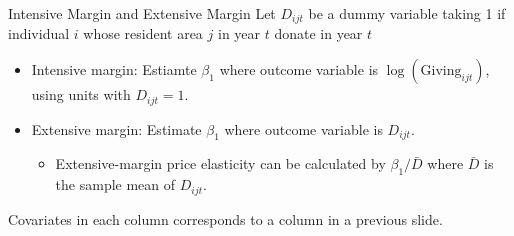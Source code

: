 \documentclass[
  ignorenonframetext,
]{beamer}
\providecommand{\tightlist}{%
  \setlength{\itemsep}{0pt}\setlength{\parskip}{0pt}}
\begin{document}
\begin{frame}{Intensive Margin and Extensive Margin}
\protect\hypertarget{intensive-margin-and-extensive-margin}{}
Let \(D_{ijt}\) be a dummy variable taking 1 if individual \(i\) whose
resident area \(j\) in year \(t\) donate in year \(t\)

\begin{itemize}
\tightlist
\item
  Intensive margin: Estiamte \(\beta_1\) where outcome variable is
  \(\log(\text{Giving}_{ijt})\), using units with \(D_{ijt} = 1\).
\item
  Extensive margin: Estimate \(\beta_1\) where outcome variable is
  \(D_{ijt}\).

  \begin{itemize}
  \tightlist
  \item
    Extensive-margin price elasticity can be calculated by
    \(\beta_1/\bar{D}\) where \(\bar{D}\) is the sample mean of
    \(D_{ijt}\).
  \end{itemize}
\end{itemize}

Covariates in each column corresponds to a column in a previous slide.
\end{frame}
\end{document}
